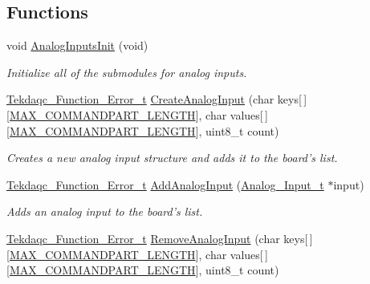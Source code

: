 \subsection*{Functions}
\begin{DoxyCompactItemize}
\item 
void \hyperlink{group__analog__input_gaf65fcf2267ddebcf80049303dc9507ce}{Analog\-Inputs\-Init} (void)
\begin{DoxyCompactList}\small\item\em Initialize all of the submodules for analog inputs. \end{DoxyCompactList}\item 
\hyperlink{group__tekdaqc__error_ga19df05d919ecca7a7501b35ae9080a32}{Tekdaqc\-\_\-\-Function\-\_\-\-Error\-\_\-t} \hyperlink{group__analog__input_gacdd326a56de1d837605d610cc638a959}{Create\-Analog\-Input} (char keys\mbox{[}$\,$\mbox{]}\mbox{[}\hyperlink{group__command__parser_ga6147771b5547853f33eb838895e3d5a2}{M\-A\-X\-\_\-\-C\-O\-M\-M\-A\-N\-D\-P\-A\-R\-T\-\_\-\-L\-E\-N\-G\-T\-H}\mbox{]}, char values\mbox{[}$\,$\mbox{]}\mbox{[}\hyperlink{group__command__parser_ga6147771b5547853f33eb838895e3d5a2}{M\-A\-X\-\_\-\-C\-O\-M\-M\-A\-N\-D\-P\-A\-R\-T\-\_\-\-L\-E\-N\-G\-T\-H}\mbox{]}, uint8\-\_\-t count)
\begin{DoxyCompactList}\small\item\em Creates a new analog input structure and adds it to the board's list. \end{DoxyCompactList}\item 
\hyperlink{group__tekdaqc__error_ga19df05d919ecca7a7501b35ae9080a32}{Tekdaqc\-\_\-\-Function\-\_\-\-Error\-\_\-t} \hyperlink{group__analog__input_gab88a5ebe3b0749d880eec3c892649454}{Add\-Analog\-Input} (\hyperlink{struct_analog___input__t}{Analog\-\_\-\-Input\-\_\-t} $\ast$input)
\begin{DoxyCompactList}\small\item\em Adds an analog input to the board's list. \end{DoxyCompactList}\item 
\hyperlink{group__tekdaqc__error_ga19df05d919ecca7a7501b35ae9080a32}{Tekdaqc\-\_\-\-Function\-\_\-\-Error\-\_\-t} \hyperlink{group__analog__input_ga221c8c5a1bbe659d613fa81a6a834dd9}{Remove\-Analog\-Input} (char keys\mbox{[}$\,$\mbox{]}\mbox{[}\hyperlink{group__command__parser_ga6147771b5547853f33eb838895e3d5a2}{M\-A\-X\-\_\-\-C\-O\-M\-M\-A\-N\-D\-P\-A\-R\-T\-\_\-\-L\-E\-N\-G\-T\-H}\mbox{]}, char values\mbox{[}$\,$\mbox{]}\mbox{[}\hyperlink{group__command__parser_ga6147771b5547853f33eb838895e3d5a2}{M\-A\-X\-\_\-\-C\-O\-M\-M\-A\-N\-D\-P\-A\-R\-T\-\_\-\-L\-E\-N\-G\-T\-H}\mbox{]}, uint8\-\_\-t count)

\end{DoxyCompactItemize}
